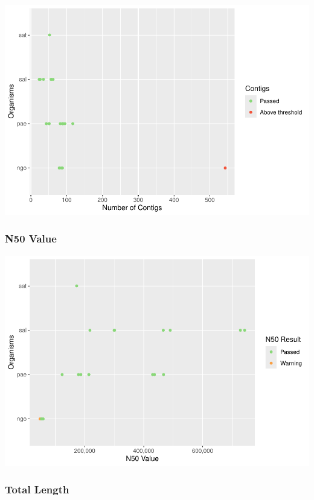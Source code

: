 \documentclass[
  a4paper,
]{article}
\begin{document}
\includegraphics{qualifyr_report_2024-07-23_files/figure-latex/unnamed-chunk-1-1.pdf}

\subsubsection{N50 Value}\label{n50-value}

\includegraphics{qualifyr_report_2024-07-23_files/figure-latex/n50_result -1.pdf}

\subsubsection{Total Length}\label{total-length}
\end{document}
